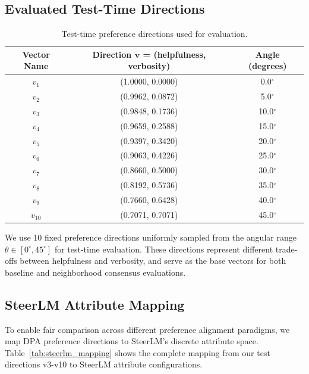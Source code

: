 \documentclass{article} %
\begin{document}
\subsection{Evaluated Test-Time Directions}

\begin{table}[t]
\centering
\caption{Test-time preference directions used for evaluation.}
\label{tab:directions_appendix}
\begin{tabular}{c|c|c}
\toprule
\textbf{Vector Name} & \textbf{Direction $\mathbf{v}$ = (helpfulness, verbosity)} & \textbf{Angle (degrees)} \\
\midrule
$v_1$ & (1.0000, 0.0000) & 0.0$^\circ$ \\
$v_2$ & (0.9962, 0.0872) & 5.0$^\circ$ \\
$v_3$ & (0.9848, 0.1736) & 10.0$^\circ$ \\
$v_4$ & (0.9659, 0.2588) & 15.0$^\circ$ \\
$v_5$ & (0.9397, 0.3420) & 20.0$^\circ$ \\
$v_6$ & (0.9063, 0.4226) & 25.0$^\circ$ \\
$v_7$ & (0.8660, 0.5000) & 30.0$^\circ$ \\
$v_8$ & (0.8192, 0.5736) & 35.0$^\circ$ \\
$v_9$ & (0.7660, 0.6428) & 40.0$^\circ$ \\
$v_{10}$ & (0.7071, 0.7071) & 45.0$^\circ$ \\
\bottomrule
\end{tabular}
\end{table}

We use 10 fixed preference directions uniformly sampled from the angular range $\theta \in [0^\circ, 45^\circ]$ for test-time evaluation. These directions represent different trade-offs between helpfulness and verbosity, and serve as the base vectors for both baseline and neighborhood consensus evaluations.

\subsection{SteerLM Attribute Mapping}

To enable fair comparison across different preference alignment paradigms, we map DPA preference directions to SteerLM's discrete attribute space. Table~\ref{tab:steerlm_mapping} shows the complete mapping from our test directions v3-v10 to SteerLM attribute configurations.
\end{document}
